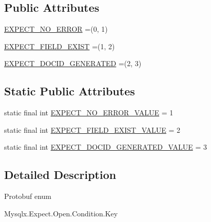\subsection*{Public Attributes}
\begin{DoxyCompactItemize}
\item 
\mbox{\hyperlink{enumcom_1_1mysql_1_1cj_1_1x_1_1protobuf_1_1_mysqlx_expect_1_1_open_1_1_condition_1_1_key_a42587c5013c4efdf8f856081a4457641}{E\+X\+P\+E\+C\+T\+\_\+\+N\+O\+\_\+\+E\+R\+R\+OR}} =(0, 1)
\item 
\mbox{\hyperlink{enumcom_1_1mysql_1_1cj_1_1x_1_1protobuf_1_1_mysqlx_expect_1_1_open_1_1_condition_1_1_key_aca67f6b924f6155fc47aa09080ad713e}{E\+X\+P\+E\+C\+T\+\_\+\+F\+I\+E\+L\+D\+\_\+\+E\+X\+I\+ST}} =(1, 2)
\item 
\mbox{\hyperlink{enumcom_1_1mysql_1_1cj_1_1x_1_1protobuf_1_1_mysqlx_expect_1_1_open_1_1_condition_1_1_key_a7303a6a5175d8fe5cbfe4e20b1ddcb44}{E\+X\+P\+E\+C\+T\+\_\+\+D\+O\+C\+I\+D\+\_\+\+G\+E\+N\+E\+R\+A\+T\+ED}} =(2, 3)
\end{DoxyCompactItemize}
\subsection*{Static Public Attributes}
\begin{DoxyCompactItemize}
\item 
static final int \mbox{\hyperlink{enumcom_1_1mysql_1_1cj_1_1x_1_1protobuf_1_1_mysqlx_expect_1_1_open_1_1_condition_1_1_key_ad7bad4a7fb752002a9fa4e15d948ffdd}{E\+X\+P\+E\+C\+T\+\_\+\+N\+O\+\_\+\+E\+R\+R\+O\+R\+\_\+\+V\+A\+L\+UE}} = 1
\item 
static final int \mbox{\hyperlink{enumcom_1_1mysql_1_1cj_1_1x_1_1protobuf_1_1_mysqlx_expect_1_1_open_1_1_condition_1_1_key_aa07fb8b80f0aee14f86e2aecb42a44e6}{E\+X\+P\+E\+C\+T\+\_\+\+F\+I\+E\+L\+D\+\_\+\+E\+X\+I\+S\+T\+\_\+\+V\+A\+L\+UE}} = 2
\item 
static final int \mbox{\hyperlink{enumcom_1_1mysql_1_1cj_1_1x_1_1protobuf_1_1_mysqlx_expect_1_1_open_1_1_condition_1_1_key_a397af0b1375555419f47569d403445e3}{E\+X\+P\+E\+C\+T\+\_\+\+D\+O\+C\+I\+D\+\_\+\+G\+E\+N\+E\+R\+A\+T\+E\+D\+\_\+\+V\+A\+L\+UE}} = 3
\end{DoxyCompactItemize}


\subsection{Detailed Description}
Protobuf enum
\begin{DoxyCode}
Mysqlx.Expect.Open.Condition.Key 
\end{DoxyCode}
 

